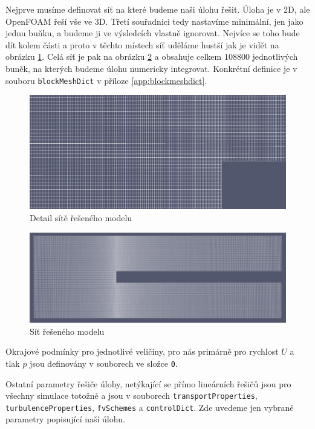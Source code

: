 \documentclass[a4paper,12pt]{report}
\theoremstyle{remark}
\begin{document}
Nejprve musíme definovat síť na které budeme naši úlohu řešit. Úloha je v 2D, ale OpenFOAM řeší vše ve 3D. Třetí souřadnici tedy nastavíme minimální, jen jako jednu buňku, a budeme ji ve výsledcích vlastně ignorovat.  Nejvíce se toho bude dít kolem  části a proto v těchto místech síť uděláme hustší jak je vidět na obrázku \ref{fig:pvmesh-detail}. Celá síť je pak na obrázku \ref{fig:pvmesh} a obsahuje celkem $108800$ jednotlivých buněk, na kterých budeme úlohu numericky integrovat. Konkrétní definice je v souboru \texttt{blockMeshDict} v příloze \ref{app:blockmeshdict}.

\begin{figure}[H]
	\centering
	\includegraphics[width=1\linewidth]{pv-mesh-detail.png}
	\caption{Detail sítě řešeného modelu}
	\label{fig:pvmesh-detail}
\end{figure}



\begin{figure}[H]
	\centering
	\includegraphics[width=1\linewidth]{pv-mesh.png}
	\caption{Síť řešeného modelu}
	\label{fig:pvmesh}
\end{figure}


Okrajové podmínky pro jednotlivé veličiny, pro nás primárně pro rychlost $U$ a tlak $p$  jsou definovány v souborech ve složce \texttt{0}.

Ostatní parametry řešiče úlohy, netýkající se přímo lineárních řešičů jsou pro všechny simulace totožné a jsou v souborech \texttt{transportProperties}, \texttt{turbulenceProperties}, \texttt{fvSchemes} a \texttt{controlDict}. Zde uvedeme jen vybrané parametry popisující naší úlohu.
\end{document}
